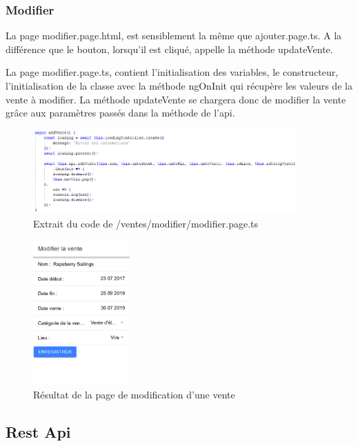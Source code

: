 			\subsubsection{Modifier}

			La page modifier.page.html, est sensiblement la même que ajouter.page.ts. A la différence que le bouton, lorsqu'il est cliqué, appelle la méthode updateVente.

			La page modifier.page.ts, contient l'initialisation des variables, le constructeur, l'initialisation de la classe avec la méthode ngOnInit qui récupère les valeurs de la vente à modifier.\newline
			La méthode updateVente se chargera donc de modifier la vente grâce aux paramètres passés dans la méthode de l'api.

			\begin{figure}[H]
				\centering\includegraphics[width=0.9\textwidth, keepaspectratio]{res/ajouterTs.png}
				\caption{Extrait du code de /ventes/modifier/modifier.page.ts}
			\end{figure}

			\begin{figure}[H]
				\centering\includegraphics[width=0.33\textwidth, keepaspectratio]{res/modifierVente.png}
				\caption{Résultat de la page de modification d'une vente}
			\end{figure}

		\subsection{Rest Api}

